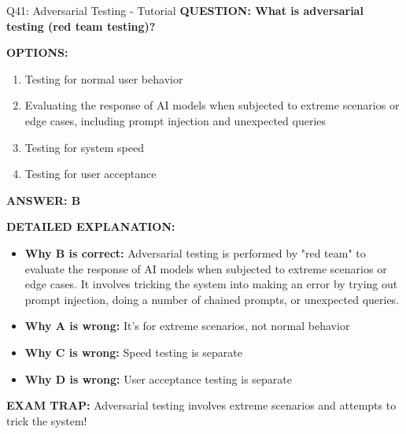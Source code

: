 \documentclass[8pt]{beamer}
\begin{document}
	\begin{frame}{Q41: Adversarial Testing - Tutorial}
		\fontsize{6.5}{7.5}\selectfont
		\textbf{QUESTION: What is adversarial testing (red team testing)?}
		
		\vspace{0.1cm}
		\textbf{OPTIONS:}
		\begin{enumerate}
			\item Testing for normal user behavior
			\item Evaluating the response of AI models when subjected to extreme scenarios or edge cases, including prompt injection and unexpected queries
			\item Testing for system speed
			\item Testing for user acceptance
		\end{enumerate}
		
		\vspace{0.1cm}
		\textcolor{myblue}{\textbf{ANSWER: B}}
		
		\vspace{0.1cm}
		\textbf{DETAILED EXPLANATION:}
		\begin{itemize}
			\item \textbf{Why B is correct:} Adversarial testing is performed by "red team" to evaluate the response of AI models when subjected to extreme scenarios or edge cases. It involves tricking the system into making an error by trying out prompt injection, doing a number of chained prompts, or unexpected queries.
			\item \textbf{Why A is wrong:} It's for extreme scenarios, not normal behavior
			\item \textbf{Why C is wrong:} Speed testing is separate
			\item \textbf{Why D is wrong:} User acceptance testing is separate
		\end{itemize}
		
		\textcolor{myred}{\textbf{EXAM TRAP:}} Adversarial testing involves \textcolor{myblue}{extreme scenarios and attempts to trick the system}!
	\end{frame}
	
\end{document}
